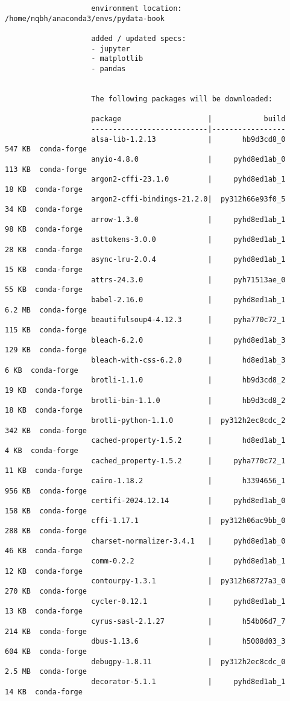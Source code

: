 \documentclass{article}
\begin{document}
\begin{enumerate}
\begin{itemize}
\begin{itemize}
\begin{itemize}
\begin{verbatim}
					environment location: /home/nqbh/anaconda3/envs/pydata-book
					
					added / updated specs:
					- jupyter
					- matplotlib
					- pandas
					
					
					The following packages will be downloaded:
					
					package                    |            build
					---------------------------|-----------------
					alsa-lib-1.2.13            |       hb9d3cd8_0         547 KB  conda-forge
					anyio-4.8.0                |     pyhd8ed1ab_0         113 KB  conda-forge
					argon2-cffi-23.1.0         |     pyhd8ed1ab_1          18 KB  conda-forge
					argon2-cffi-bindings-21.2.0|  py312h66e93f0_5          34 KB  conda-forge
					arrow-1.3.0                |     pyhd8ed1ab_1          98 KB  conda-forge
					asttokens-3.0.0            |     pyhd8ed1ab_1          28 KB  conda-forge
					async-lru-2.0.4            |     pyhd8ed1ab_1          15 KB  conda-forge
					attrs-24.3.0               |     pyh71513ae_0          55 KB  conda-forge
					babel-2.16.0               |     pyhd8ed1ab_1         6.2 MB  conda-forge
					beautifulsoup4-4.12.3      |     pyha770c72_1         115 KB  conda-forge
					bleach-6.2.0               |     pyhd8ed1ab_3         129 KB  conda-forge
					bleach-with-css-6.2.0      |       hd8ed1ab_3           6 KB  conda-forge
					brotli-1.1.0               |       hb9d3cd8_2          19 KB  conda-forge
					brotli-bin-1.1.0           |       hb9d3cd8_2          18 KB  conda-forge
					brotli-python-1.1.0        |  py312h2ec8cdc_2         342 KB  conda-forge
					cached-property-1.5.2      |       hd8ed1ab_1           4 KB  conda-forge
					cached_property-1.5.2      |     pyha770c72_1          11 KB  conda-forge
					cairo-1.18.2               |       h3394656_1         956 KB  conda-forge
					certifi-2024.12.14         |     pyhd8ed1ab_0         158 KB  conda-forge
					cffi-1.17.1                |  py312h06ac9bb_0         288 KB  conda-forge
					charset-normalizer-3.4.1   |     pyhd8ed1ab_0          46 KB  conda-forge
					comm-0.2.2                 |     pyhd8ed1ab_1          12 KB  conda-forge
					contourpy-1.3.1            |  py312h68727a3_0         270 KB  conda-forge
					cycler-0.12.1              |     pyhd8ed1ab_1          13 KB  conda-forge
					cyrus-sasl-2.1.27          |       h54b06d7_7         214 KB  conda-forge
					dbus-1.13.6                |       h5008d03_3         604 KB  conda-forge
					debugpy-1.8.11             |  py312h2ec8cdc_0         2.5 MB  conda-forge
					decorator-5.1.1            |     pyhd8ed1ab_1          14 KB  conda-forge

\end{verbatim}
\end{itemize}
\end{itemize}
\end{itemize}
\end{enumerate}
\end{document}
